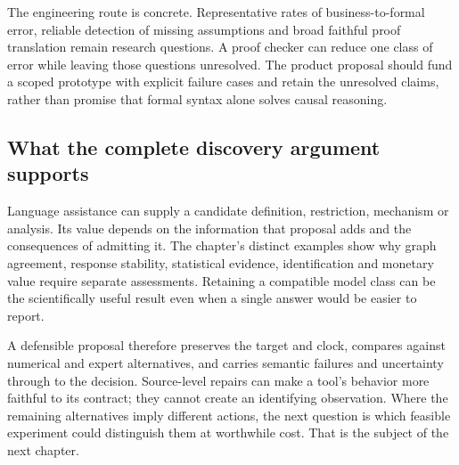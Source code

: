 The engineering route is concrete. Representative rates of business-to-formal
error, reliable detection of missing assumptions and broad faithful proof
translation remain research questions. A proof checker can reduce one class of
error while leaving those questions unresolved. The product proposal should
fund a scoped prototype with explicit failure cases and retain the unresolved
claims, rather than promise that formal syntax alone solves causal reasoning.
\citep{exec14_ident_contract}
\subsection{What the complete discovery argument supports}

Language assistance can supply a candidate definition, restriction, mechanism
or analysis. Its value depends on the information that proposal adds and the
consequences of admitting it. The chapter's distinct examples show why graph
agreement, response stability, statistical evidence, identification and
monetary value require separate assessments. Retaining a compatible model
class can be the scientifically useful result even when a single answer would
be easier to report.

A defensible proposal therefore preserves the target and clock, compares
against numerical and expert alternatives, and carries semantic failures and
uncertainty through to the decision. Source-level repairs can make a tool's
behavior more faithful to its contract; they cannot create an identifying
observation. Where the remaining alternatives imply different actions, the
next question is which feasible experiment could distinguish them at worthwhile
cost. That is the subject of the next chapter.
\label{exec14:llm-identification-end}

